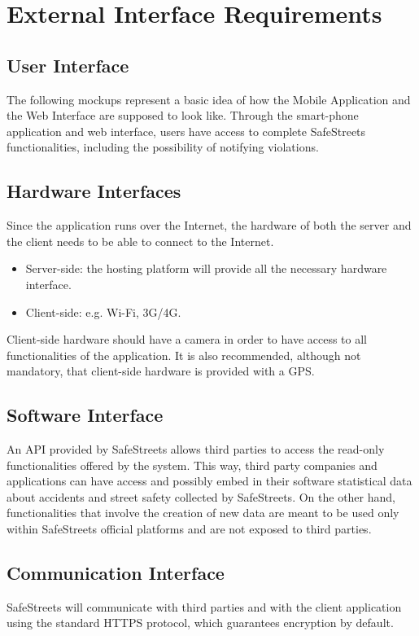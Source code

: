\section{External Interface Requirements}

\subsection{User Interface}
The following mockups represent a basic idea of how the Mobile Application
and the Web Interface are supposed to look like.
Through the smart-phone application and web interface, users have access to complete SafeStreets functionalities, including the possibility of notifying violations.

\subsection{Hardware Interfaces}
Since the application runs over the Internet, the hardware of both the server and the client needs to be able to connect to the Internet.
\begin{itemize}
  \item Server-side: the hosting platform will provide all the necessary hardware interface.
  \item Client-side: e.g. Wi-Fi, 3G/4G. 
\end{itemize}
Client-side hardware should have a camera in order to have access to all functionalities of the application. It is also recommended, although not mandatory, that client-side hardware is provided with a GPS.


\subsection{Software Interface}
An API provided by SafeStreets allows third parties to access the read-only functionalities offered by the system. This way, third party companies and applications can have access and possibly embed in their software statistical data about accidents and street safety collected by SafeStreets. 
On the other hand, functionalities that involve the creation of new data are meant to be used only within SafeStreets official platforms and are not exposed to third parties.

\subsection{Communication Interface}
SafeStreets will communicate with third parties and with the client application using the standard HTTPS protocol, which guarantees encryption by default.